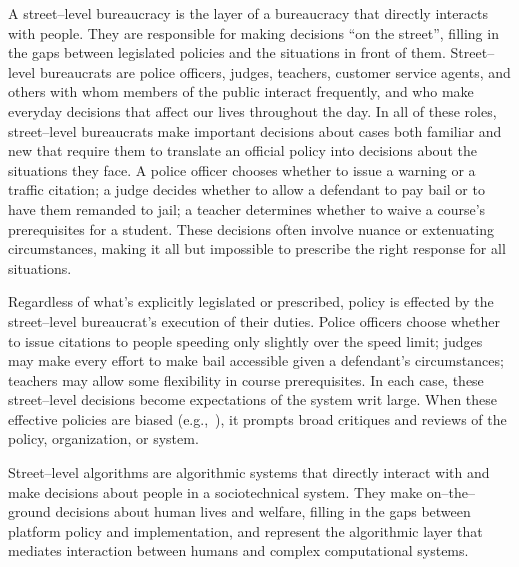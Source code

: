 \documentclass[main]{subfiles}
\begin{document}
A street--level bureaucracy is the layer of a bureaucracy that directly interacts with people.
They are responsible for making decisions ``on the street'',
filling in the gaps between legislated policies and the situations in front of them.
Street--level bureaucrats are
police officers, judges, teachers, customer service agents, and others
with whom members of the public interact frequently, and
who make everyday decisions that affect our lives throughout the day.
In all of these roles,
street--level bureaucrats make important decisions about
cases both familiar and new that require them to translate an official policy into decisions about the situations they face.
A police officer chooses whether to issue a warning or a traffic citation;
a judge decides whether to allow a defendant to pay bail or to have them remanded to jail;
a teacher determines whether to waive a course's prerequisites for a student.
These decisions often involve nuance or extenuating circumstances,
making it all but impossible to prescribe the right response for all situations.

Regardless of what's explicitly legislated or prescribed,
policy is effected by the street--level bureaucrat's execution of their duties.
Police officers choose whether to issue citations to people speeding only slightly over the speed limit;
judges may make every effort to make bail accessible given a defendant's circumstances;
teachers may allow some flexibility in course prerequisites.
In each case, these street--level decisions become expectations of the system writ large.
When these effective policies are biased
(e.g.,~\cite{Voigt6521}),
it prompts broad critiques and reviews of the policy, organization, or system.


Street--level algorithms are algorithmic systems that directly interact with and make decisions about people in a sociotechnical system.
They make on--the--ground decisions about human lives and welfare,
filling in the gaps between platform policy and implementation, and
represent the algorithmic layer that mediates interaction between humans and complex computational systems.
\end{document}
